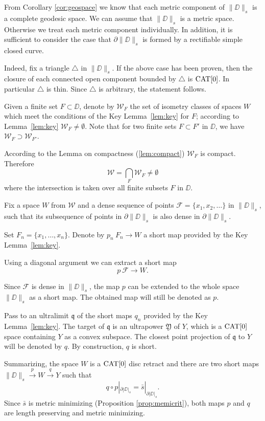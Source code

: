 \documentclass{article}
\begin{document}
From Corollary \ref{cor:geospace} we know that each metric component of $\|\DD\|_s$ is a complete geodesic space.
We can assume that $\|\DD\|_s$ is a metric space. Otherwise we treat each metric component 
individually.
In addition, it is sufficient to consider
the case that $\partial \|\DD\|_s$ is formed by a rectifiable simple closed curve.

Indeed, fix a triangle $\triangle$ in $\|\DD\|_s$. 
If the above case has been proven, 
then the closure of each connected open component bounded by $\triangle$ is $\mathop{\rm CAT}\nolimits[0]$.
In particular $\triangle$ is thin.
Since $\triangle$ is arbitrary, the statement follows.


Given a finite set $F\subset \DD$,
denote by $\mathcal{W}_F$
the set of isometry classes of spaces $W$ which meet the conditions of the Key Lemma~\ref{lem:key}
for $F$;
according to Lemma~\ref{lem:key} $\mathcal{W}_F\ne\emptyset$.
Note that for two finite sets $F\subset F'$ in $\DD$,
we have $\mathcal{W}_F\supset \mathcal{W}_{F'}$.

According to the Lemma on compactness (\ref{lem:compact}) $\mathcal{W}_F$ is compact.
Therefore 
\[\mathcal{W}
=
\bigcap_{F}\mathcal{W}_F\ne \emptyset\]
where the intersection is taken over all finite subsets $F$ in $\DD$. 

Fix a space $W$ from $\mathcal{W}$
and a dense sequence of points $\mathcal{F}=\{x_1,x_2,\dots\}$ in $\|\DD\|_s$, 
such that its subsequence of points in $\partial \|\DD\|_s$ is
 also dense in $\partial \|\DD\|_s$.

Set $F_n=\{x_1,\dots,x_n\}$.
Denote by $p_n\:F_n\to W$ a short map provided by the Key Lemma~\ref{lem:key}.

Using a diagonal argument we can extract a short map 
\[p\:\mathcal{F}\to W.\]

Since $\mathcal{F}$ is dense in $\|\DD\|_s$,
the map $p$ can be extended to the whole space $\|\DD\|_s$ 
as a short map.
The obtained map will still be denoted as $p$.

Pass to an ultralimit $\mathfrak{q}$ of the short maps $q_n$ provided by the Key Lemma~\ref{lem:key}. The target of $\mathfrak{q}$ is an ultrapower  $\mathfrak{Y}$ of $Y$,
which is a $\mathop{\rm CAT}\nolimits[0]$ space containing $Y$ as a convex subspace.
The closest point projection of $\mathfrak{q}$ to $Y$ will be denoted by $q$.
By construction, $q$ is short.


Summarizing, the space $W$ is a $\mathop{\rm CAT}\nolimits[0]$ disc retract and
 there are two short maps 
$\|\DD\|_s\xrightarrow{p} W \xrightarrow{q} Y$
such that 
\[q\circ p|_{\partial|\DD|_s}=\bar s|_{\partial|\DD|_s}.\] 
Since $\bar s$ is metric minimizing (Proposition \ref{prop:memicrit}), both maps $p$ and $q$ are length preserving and metric minimizing.
\end{document}
